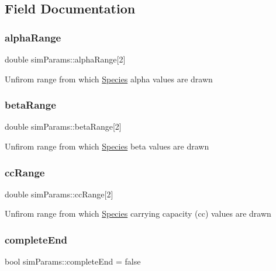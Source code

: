 \subsection{Field Documentation}
\mbox{\label{structsimParams_a2674f228bf6b33bf35dc6d1cfb6befba}} 
\subsubsection{\texorpdfstring{alpha\+Range}{alphaRange}}
{\footnotesize\ttfamily double sim\+Params\+::alpha\+Range\mbox{[}2\mbox{]}}

Unfirom range from which \hyperlink{classSpecies}{Species} alpha values are drawn \mbox{\label{structsimParams_a676b73cd7d60743090c9f2b4c166c083}} 
\subsubsection{\texorpdfstring{beta\+Range}{betaRange}}
{\footnotesize\ttfamily double sim\+Params\+::beta\+Range\mbox{[}2\mbox{]}}

Unfirom range from which \hyperlink{classSpecies}{Species} beta values are drawn \mbox{\label{structsimParams_a730247ea2898e90b85dd99c55d8a18e3}} 
\subsubsection{\texorpdfstring{cc\+Range}{ccRange}}
{\footnotesize\ttfamily double sim\+Params\+::cc\+Range\mbox{[}2\mbox{]}}

Unfirom range from which \hyperlink{classSpecies}{Species} carrying capacity (cc) values are drawn \mbox{\label{structsimParams_a7b06eae32b1691cb52bfc4a7e135f589}} 
\subsubsection{\texorpdfstring{complete\+End}{completeEnd}}
{\footnotesize\ttfamily bool sim\+Params\+::complete\+End = false}

